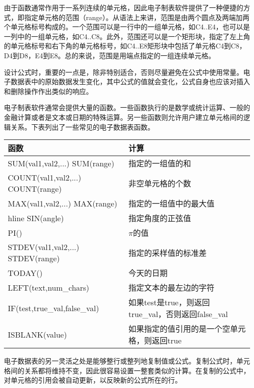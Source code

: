 由于函数通常作用于一系列连续的单元格，因此电子制表软件提供了一种便捷的方式，即指定单元格的范围（range）。从语法上来讲，范围是由两个圆点及两端加两个单元格标号构成的。一个范围可以是一行中的一组单元格，如C4..E4，也可以是一列中的一组单元格，如C4..C8。此外，范围还可以是一个矩形块，指定了左上角的单元格标号和右下角的单元格标号，如C4..E8矩形块中包括了单元格C4到C8，D4到D8，E4到E8。总的来说，范围是用端点指定的一组连续单元格。

设计公式时，重要的一点是，除非特别适合，否则尽量避免在公式中使用常量。电子数据表中的原始数据发生变化，其中公式的值就会变化，公式自身也应该对插入和删除操作作出类似的响应。

电子制表软件通常会提供大量的函数。一些函数执行的是数学或统计运算、一般的金融计算或者是文本或日期的特殊运算。另一些函数则允许用户建立单元格间的逻辑关系。下表列出了一些常见的电子数据表函数。


\begin{table}[!h]
\begin{tabular}{|l|l|}
\hline
函数				&计算\\
\hline
SUM(val1,val2,...) 
\newline SUM(range)&指定的一组值的和\\
\hline
COUNT(val1,val2,...)
\newline COUNT(range)&非空单元格的个数\\
\hline
MAX(val1,val2,...)
\newline MAX(range)&指定的一组值中的最大值\\
hline
SIN(angle)	&指定角度的正弦值\\
\hline
PI()			&$\pi$的值\\
\hline
STDEV(val1,val2,...)
\newline STDEV(range)&指定的采样值的标准差\\
\hline
TODAY()	&今天的日期\\
\hline
LEFT(text,num\_chars)&指定文本的最左边的字符\\
\hline
IF(test,true\_val,false\_val)&如果test是true，则返回true\_val，否则返回false\_val\\
\hline
ISBLANK(value)&如果指定的值引用的是一个空单元格，则返回true\\
\hline
\end{tabular}
\end{table}



电子数据表的另一灵活之处是能够整行或整列地复制值或公式。复制公式时，单元格间的关系都将维持不变，因此很容易设置一整套类似的计算。在复制的公式中，对单元格的引用会被自动更新，以反映新的公式所在的行。



